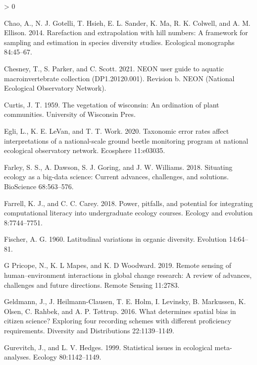 \documentclass[
  12pt,
]{article}
\newlength{\cslhangindent}
\newenvironment{CSLReferences}[2] %
 {%
  \setlength{\parindent}{0pt}
  \ifodd #1 \everypar{\setlength{\hangindent}{\cslhangindent}}\ignorespaces\fi
  \ifnum #2 > 0
  \setlength{\parskip}{#2\baselineskip}
  \fi
 }%
 {}
\begin{document}
\begin{CSLReferences}{1}{0}
\leavevmode\hypertarget{ref-chao2014rarefaction}{}%
Chao, A., N. J. Gotelli, T. Hsieh, E. L. Sander, K. Ma, R. K. Colwell, and A. M. Ellison. 2014. Rarefaction and extrapolation with hill numbers: A framework for sampling and estimation in species diversity studies. Ecological monographs 84:45--67.

\leavevmode\hypertarget{ref-Chesney2021}{}%
Chesney, T., S. Parker, and C. Scott. 2021. NEON user guide to aquatic macroinvertebrate collection (DP1.20120.001). Revision b. NEON (National Ecological Observatory Network).

\leavevmode\hypertarget{ref-curtis1959vegetation}{}%
Curtis, J. T. 1959. The vegetation of wisconsin: An ordination of plant communities. University of Wisconsin Pres.

\leavevmode\hypertarget{ref-egli2020taxonomic}{}%
Egli, L., K. E. LeVan, and T. T. Work. 2020. Taxonomic error rates affect interpretations of a national-scale ground beetle monitoring program at national ecological observatory network. Ecosphere 11:e03035.

\leavevmode\hypertarget{ref-farley2018situating}{}%
Farley, S. S., A. Dawson, S. J. Goring, and J. W. Williams. 2018. Situating ecology as a big-data science: Current advances, challenges, and solutions. BioScience 68:563--576.

\leavevmode\hypertarget{ref-farrell2018power}{}%
Farrell, K. J., and C. C. Carey. 2018. Power, pitfalls, and potential for integrating computational literacy into undergraduate ecology courses. Ecology and evolution 8:7744--7751.

\leavevmode\hypertarget{ref-fischer1960latitudinal}{}%
Fischer, A. G. 1960. Latitudinal variations in organic diversity. Evolution 14:64--81.

\leavevmode\hypertarget{ref-g2019remote}{}%
G Pricope, N., K. L Mapes, and K. D Woodward. 2019. Remote sensing of human--environment interactions in global change research: A review of advances, challenges and future directions. Remote Sensing 11:2783.

\leavevmode\hypertarget{ref-geldmann2016determines}{}%
Geldmann, J., J. Heilmann-Clausen, T. E. Holm, I. Levinsky, B. Markussen, K. Olsen, C. Rahbek, and A. P. Tøttrup. 2016. What determines spatial bias in citizen science? Exploring four recording schemes with different proficiency requirements. Diversity and Distributions 22:1139--1149.

\leavevmode\hypertarget{ref-gurevitch1999statistical}{}%
Gurevitch, J., and L. V. Hedges. 1999. Statistical issues in ecological meta-analyses. Ecology 80:1142--1149.


\end{CSLReferences}
\end{document}
